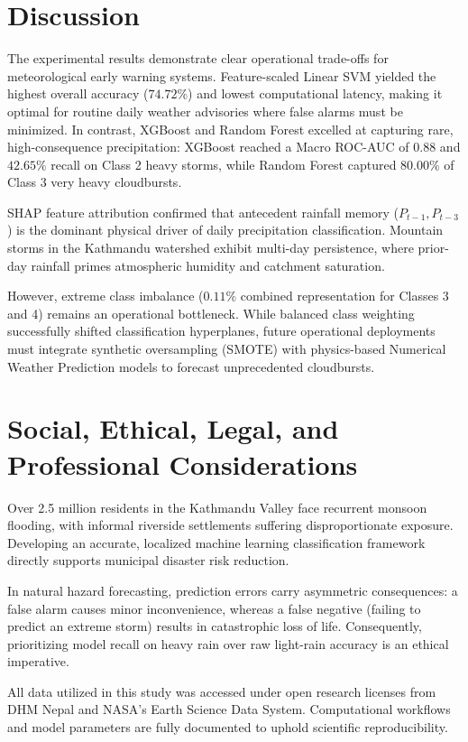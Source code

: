 \documentclass[conference]{IEEEtran}
\begin{document}
\section{Discussion}
\label{sec:discussion}
The experimental results demonstrate clear operational trade-offs for meteorological early warning systems. Feature-scaled Linear SVM yielded the highest overall accuracy ($74.72\%$) and lowest computational latency, making it optimal for routine daily weather advisories where false alarms must be minimized. In contrast, XGBoost and Random Forest excelled at capturing rare, high-consequence precipitation: XGBoost reached a Macro ROC-AUC of $0.88$ and $42.65\%$ recall on Class 2 heavy storms, while Random Forest captured $80.00\%$ of Class 3 very heavy cloudbursts.

SHAP feature attribution confirmed that antecedent rainfall memory ($P_{t-1}, P_{t-3}$) is the dominant physical driver of daily precipitation classification. Mountain storms in the Kathmandu watershed exhibit multi-day persistence, where prior-day rainfall primes atmospheric humidity and catchment saturation.

However, extreme class imbalance ($0.11\%$ combined representation for Classes 3 and 4) remains an operational bottleneck. While balanced class weighting successfully shifted classification hyperplanes, future operational deployments must integrate synthetic oversampling (SMOTE) with physics-based Numerical Weather Prediction models to forecast unprecedented cloudbursts.


\section{Social, Ethical, Legal, and Professional Considerations}
\label{sec:social_ethical}
Over 2.5 million residents in the Kathmandu Valley face recurrent monsoon flooding, with informal riverside settlements suffering disproportionate exposure. Developing an accurate, localized machine learning classification framework directly supports municipal disaster risk reduction.

In natural hazard forecasting, prediction errors carry asymmetric consequences: a false alarm causes minor inconvenience, whereas a false negative (failing to predict an extreme storm) results in catastrophic loss of life. Consequently, prioritizing model recall on heavy rain over raw light-rain accuracy is an ethical imperative.

All data utilized in this study was accessed under open research licenses from DHM Nepal and NASA's Earth Science Data System. Computational workflows and model parameters are fully documented to uphold scientific reproducibility.
\end{document}
